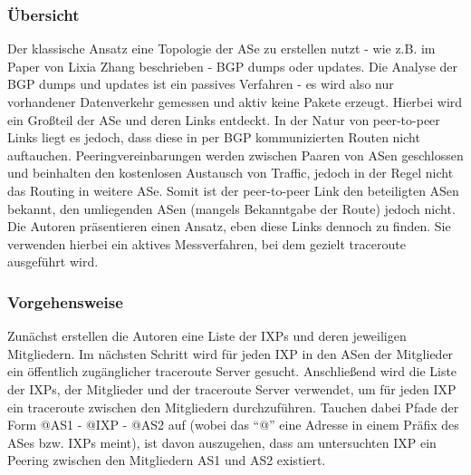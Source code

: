 \subsubsection{Übersicht}
Der klassische Ansatz eine Topologie der ASe zu erstellen nutzt - wie z.B. im Paper von Lixia Zhang beschrieben - BGP dumps oder updates.
Die Analyse der BGP dumps und updates ist ein passives Verfahren - es wird also nur vorhandener Datenverkehr gemessen und aktiv keine Pakete erzeugt.
Hierbei wird ein Großteil der ASe und deren Links entdeckt.
In der Natur von peer-to-peer Links liegt es jedoch, dass diese in per BGP kommunizierten Routen nicht auftauchen.
Peeringvereinbarungen werden zwischen Paaren von ASen geschlossen und beinhalten den kostenlosen Austausch von Traffic, jedoch in der Regel nicht das Routing in weitere ASe.
Somit ist der peer-to-peer Link den beteiligten ASen bekannt, den umliegenden ASen (mangels Bekanntgabe der Route) jedoch nicht.
Die Autoren präsentieren einen Ansatz, eben diese Links dennoch zu finden.
Sie verwenden hierbei ein aktives Messverfahren, bei dem gezielt traceroute ausgeführt wird.

\subsubsection{Vorgehensweise}
Zunächst erstellen die Autoren eine Liste der IXPs und deren jeweiligen Mitgliedern.
Im nächsten Schritt wird für jeden IXP in den ASen der Mitglieder ein öffentlich zugänglicher traceroute Server gesucht.
Anschließend wird die Liste der IXPs, der Mitglieder und der traceroute Server verwendet, um für jeden IXP ein traceroute zwischen den Mitgliedern durchzuführen.
Tauchen dabei Pfade der Form @AS1 - @IXP - @AS2 auf (wobei das "`@"' eine Adresse in einem Präfix des ASes bzw. IXPs meint), ist davon auszugehen, dass am untersuchten IXP ein Peering zwischen den Mitgliedern AS1 und AS2 existiert.



